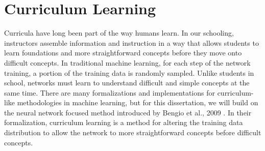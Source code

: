 \section{Curriculum Learning}
\label{chap:intro:sec:cl}
Curricula have long been part of the way humans learn. In our schooling, instructors assemble information and instruction in a way that allows students to learn foundations and more straightforward concepts before they move onto difficult concepts. In traditional machine learning, for each step of the network training, a portion of the training data is randomly sampled. Unlike students in school, networks must learn to understand difficult and simple concepts at the same time. There are many formalizations and implementations for curriculum-like methodologies in machine learning, but for this dissertation, we will build on the neural network focused method introduced by Bengio et al., 2009 \cite{Bengio2009CurriculumL}. In their formalization, curriculum learning is a method for altering the training data distribution to allow the network to more straightforward concepts before difficult concepts.
